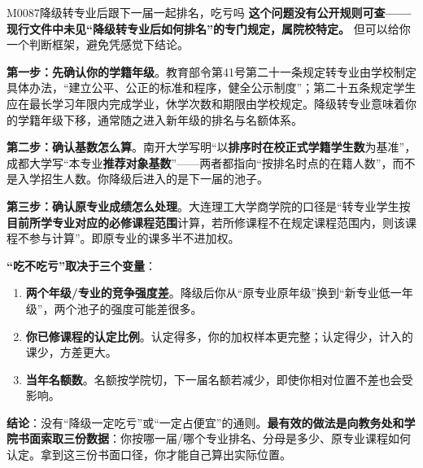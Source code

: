 \begin{qa}{M0087}{降级转专业后跟下一届一起排名，吃亏吗}
\textbf{这个问题没有公开规则可查——现行文件中未见“降级转专业后如何排名”的专门规定，属院校特定。} 但可以给你一个判断框架，避免凭感觉下结论。

\textbf{第一步：先确认你的学籍年级}。教育部令第41号第二十一条规定转专业由学校制定具体办法，“建立公平、公正的标准和程序，健全公示制度”；第二十五条规定学生应在最长学习年限内完成学业，休学次数和期限由学校规定。降级转专业意味着你的学籍年级下移，通常随之进入新年级的排名与名额体系。

\textbf{第二步：确认基数怎么算}。南开大学写明“以\textbf{排序时在校正式学籍学生数}为基准”，成都大学写“本专业\textbf{推荐对象基数}”——两者都指向“按排名时点的在籍人数”，而不是入学招生人数。你降级后进入的是下一届的池子。

\textbf{第三步：确认原专业成绩怎么处理}。大连理工大学商学院的口径是“转专业学生按\textbf{目前所学专业对应的必修课程范围}计算，若所修课程不在规定课程范围内，则该课程不参与计算”。即原专业的课多半不进加权。

\textbf{“吃不吃亏”取决于三个变量}：
\begin{enumerate}
  \item \textbf{两个年级/专业的竞争强度差}。降级后你从“原专业原年级”换到“新专业低一年级”，两个池子的强度可能差很多。
  \item \textbf{你已修课程的认定比例}。认定得多，你的加权样本更完整；认定得少，计入的课少，方差更大。
  \item \textbf{当年名额数}。名额按学院切，下一届名额若减少，即使你相对位置不差也会受影响。
\end{enumerate}

\textbf{结论}：没有“降级一定吃亏”或“一定占便宜”的通则。\textbf{最有效的做法是向教务处和学院书面索取三份数据}：你按哪一届/哪个专业排名、分母是多少、原专业课程如何认定。拿到这三份书面口径，你才能自己算出实际位置。
\end{qa}

